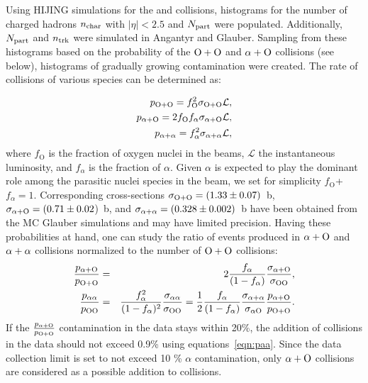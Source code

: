 
Using HIJING simulations for the \OO and \Oa collisions, histograms for the number of charged hadrons $n_\text{char}$ with $|\eta|< 2.5$  and $N_{\text{part}}$ were populated. Additionally, $N_{\text{part}}$ and $n_\text{trk}$ were simulated in Angantyr and Glauber. Sampling from these histograms based on the probability of the $\OO$ and $\Oa$ collisions (see below), histograms of gradually growing contamination were created. The rate of collisions of various species can be determined as: 

\begin{equation}
\begin{split}
    p_{\OO} = f_{\mathrm{O}}^{2} \sigma_{\OO} \mathcal{L}, \\
    p_{\Oa} = 2 f_{\mathrm{O}} f_{\alpha} \sigma_{\Oa} \mathcal{L}, \\
    p_{\alal} = f_{\alpha}^{2} \sigma_{\alal} \mathcal{L},
\end{split}
\end{equation}
where $f_{\mathrm{O}}$ is the fraction of oxygen nuclei in the beams, $\mathcal{L}$ the instantaneous luminosity, and $f_{\alpha}$ is the fraction of $\alpha$. Given $\alpha$ is expected to play the dominant role among the parasitic nuclei species in the \OO beam, we set for simplicity $f_{\mathrm{O}}$+$f_{\alpha} = 1$. Corresponding cross-sections $\sigma_{\OO}= (1.33\pm0.07)$~b, $\sigma_{\Oa} = (0.71\pm0.02$)~b, and $\sigma_{\alal} = (0.328\pm0.002)$~b have been obtained from the MC Glauber simulations and may have limited precision. Having these probabilities at hand, one can study the ratio of events produced in $\Oa$ and $\alal$ collisions normalized to the number of $\OO$ collisions:
\begin{eqnarray}
\frac{p_{\Oa}}{p_{\OO}} &=& 2 \frac{f_{\alpha}}{(1-f_{\alpha})} \frac{\sigma_{\mathrm{\Oa}}}{\sigma_{\mathrm{OO}}}, \nonumber \\
\frac{p_{\mathrm{\alpha\alpha}}}{p_{\mathrm{OO}}} &=& \frac{f^2_{\mathrm{\alpha}}}{(1-f_{\alpha})^2} \frac{\sigma_{\mathrm{\alpha\alpha}}}{\sigma_{\mathrm{OO}}} = 
\frac{1}{2}\frac{f_{\mathrm{\alpha}}}{(1-f_{\alpha})}
\frac{\sigma_{\alal}}{\sigma_{\alpha\mathrm{O}}}
\frac{p_{\Oa}}{p_{\OO}}.
\label{eqn:paa}
\end{eqnarray}
If the $\frac{p_{\Oa}}{p_{\OO}}$ contamination in the data stays within 20\%, the addition of \alal collisions in the data should not exceed 0.9\% using equations~\ref{eqn:paa}. Since the data collection limit is set to not exceed 10 \% $\alpha$ contamination, only $\Oa$ collisions are considered as a possible addition to \OO collisions.

